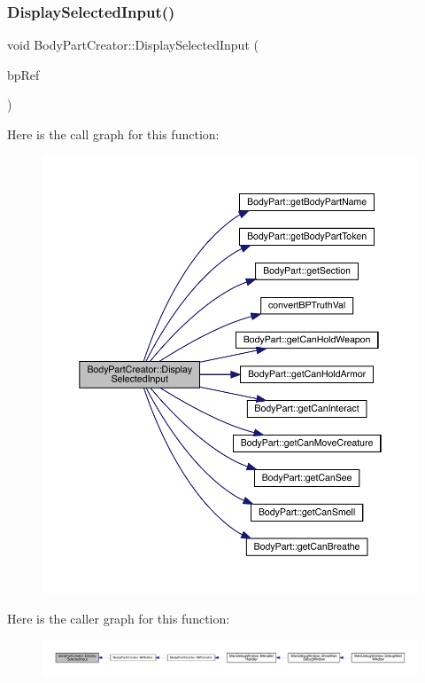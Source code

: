 \subsubsection{\texorpdfstring{Display\+Selected\+Input()}{DisplaySelectedInput()}}
{\footnotesize\ttfamily void Body\+Part\+Creator\+::\+Display\+Selected\+Input (\begin{DoxyParamCaption}\item[{\mbox{\hyperlink{class_body_part}{Body\+Part}} \&}]{bp\+Ref }\end{DoxyParamCaption})}

Here is the call graph for this function\+:
\nopagebreak
\begin{figure}[H]
\begin{center}
\leavevmode
\includegraphics[width=350pt]{d8/d3a/namespace_body_part_creator_af0715dc94164f78c721237555a28209c_cgraph}
\end{center}
\end{figure}
Here is the caller graph for this function\+:
\nopagebreak
\begin{figure}[H]
\begin{center}
\leavevmode
\includegraphics[width=350pt]{d8/d3a/namespace_body_part_creator_af0715dc94164f78c721237555a28209c_icgraph}
\end{center}
\end{figure}
\mbox{\label{namespace_body_part_creator_a7d0a8af2804bcc6a41e19b1d84013efd}} 

